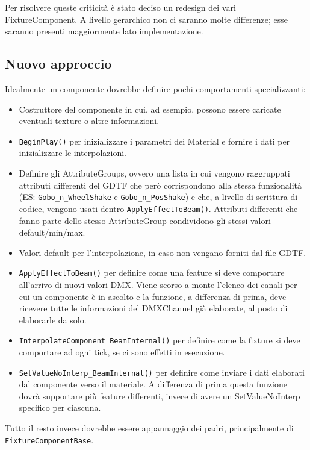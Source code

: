 \documentclass[main.tex]{subfiles}
\begin{document}
Per risolvere queste criticità è stato deciso un redesign dei vari FixtureComponent. A livello gerarchico non ci saranno molte differenze; esse saranno presenti maggiormente lato implementazione.

\subsection{Nuovo approccio}\label{subsec:3_idea}
Idealmente un componente dovrebbe definire pochi comportamenti specializzanti:
\begin{itemize}
    \item Costruttore del componente in cui, ad esempio, possono essere caricate eventuali texture o altre informazioni.
    \item \lstinline{BeginPlay()} per inizializzare i parametri dei Material e fornire i dati per inizializzare le interpolazioni.
    \item Definire gli AttributeGroups, ovvero una lista in cui vengono raggruppati attributi differenti del GDTF che però corrispondono alla stessa funzionalità (ES: \lstinline{Gobo_n_WheelShake} e \lstinline{Gobo_n_PosShake}) e che, a livello di scrittura di codice, vengono usati  dentro \lstinline{ApplyEffectToBeam()}. Attributi differenti che fanno parte dello stesso AttributeGroup condividono gli stessi valori default/min/max.
    \item Valori default per l'interpolazione, in caso non vengano forniti dal file GDTF.
    \item \lstinline{ApplyEffectToBeam()} per definire come una feature si deve comportare all'arrivo di nuovi valori DMX. Viene scorso a monte l'elenco dei canali per cui un componente è in ascolto e la funzione, a differenza di prima, deve ricevere tutte le informazioni del DMXChannel già elaborate, al posto di elaborarle da solo. 
    \item \lstinline{InterpolateComponent_BeamInternal()} per definire come la fixture si deve comportare ad ogni tick, se ci sono effetti in esecuzione.
    \item \lstinline{SetValueNoInterp_BeamInternal()} per definire come inviare i dati elaborati dal componente verso il materiale. A differenza di prima questa funzione dovrà supportare più feature differenti, invece di avere un SetValueNoInterp specifico per ciascuna.
\end{itemize}

\noindent Tutto il resto invece dovrebbe essere appannaggio  dei padri, principalmente di \lstinline{FixtureComponentBase}. %
\end{document}
